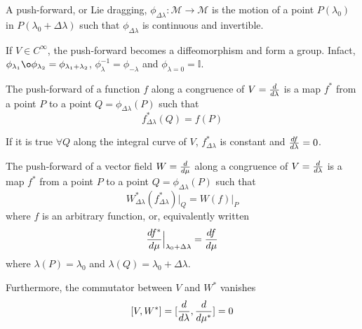     \begin{definition}
        A push-forward, or Lie dragging, $\phi_{\Delta \lambda} \colon \mathcal M \rightarrow \mathcal M$ is the motion of a point $P(\lambda_0)$ in $P(\lambda_0 + \Delta \lambda)$ such that $\phi_{\Delta \lambda}$ is continuous and invertible.
    \end{definition} 
    
    If $V \in C^{\infty}$, the push-forward becomes a diffeomorphism and form a group. Infact, $\phi_{\lambda_1} \o \phi_{\lambda_2} = \phi_{\lambda_1 + \lambda_2}$, $\phi_{\lambda}^{-1} = \phi_{- \lambda}$ and $\phi_{\lambda = 0} = \mathbb I$. 

    \begin{definition}
        The push-forward of a function $f$ along a congruence of $V = \frac{d}{d\lambda}$ is a map $f^*$ from a point $P$ to a point $Q = \phi_{\Delta \lambda}(P) $ such that
        \begin{equation*}
            f^*_{\Delta \lambda} (Q) = f(P) 
        \end{equation*}
    \end{definition}
    If it is true $\forall Q$ along the integral curve of $V$, $f^*_{\Delta \lambda}$ is constant and $\frac{df}{d\lambda} = 0$.

    \begin{definition}
        The push-forward of a vector field $W = \frac{d}{d\mu}$ along a congruence of $V = \frac{d}{d\lambda}$ is a map $f^*$ from a point $P$ to a point $Q = \phi_{\Delta \lambda}(P) $ such that
        \begin{equation*}
            W^*_{\Delta \lambda} (f^*_{\Delta \lambda}) \vert_Q = W (f) \vert_P
        \end{equation*}
        where $f$ is an arbitrary function, or, equivalently written  
        \begin{equation*}
            \frac{df^*}{d\mu} \Big\vert_{\lambda_0 + \Delta \lambda} = \frac{df}{d\mu}
        \end{equation*}
        where $\lambda(P) = \lambda_0$ and $\lambda(Q) = \lambda_0 + \Delta \lambda$.
    \end{definition}
    
    Furthermore, the commutator between $V$ and $W^*$ vanishes
    \begin{equation}\label{comm}
        [V, W^*] = [\frac{d}{d\lambda}, \frac{d}{d\mu^*}] = 0
    \end{equation}

